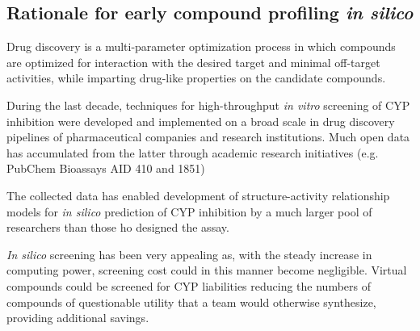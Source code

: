\subsection{Rationale for early compound profiling \textit{in silico}}

Drug discovery is a multi-parameter optimization process in which compounds are optimized for interaction with the desired target and minimal off-target activities, while imparting drug-like properties on the candidate compounds.\cite{Zlokarnik2005}



During the last decade, techniques for high-throughput \textit{in vitro} screening of CYP inhibition were developed and implemented on a broad scale in drug discovery pipelines of pharmaceutical companies and research institutions. Much open data has accumulated from the latter through academic research initiatives (e.g. PubChem Bioassays AID 410 and 1851)

The collected data has enabled development of structure-activity relationship models for \textit{in silico} prediction of CYP inhibition by a much larger pool of researchers than those ho designed the assay.


\textit{In silico} screening has been very appealing as, with the steady increase in computing power, screening cost could in this manner become negligible. Virtual compounds could be screened for CYP liabilities reducing the numbers of compounds of questionable utility that a team would otherwise synthesize, providing additional savings.\cite{Zlokarnik2005}


